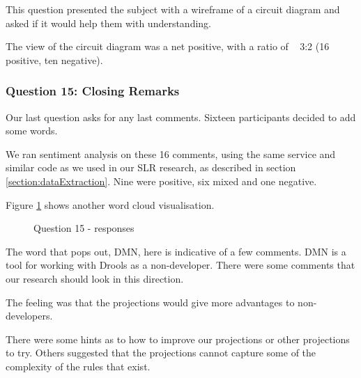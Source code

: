 This question presented the subject with a wireframe of a circuit diagram and asked if it would help them with understanding.

The view of the circuit diagram was a net positive, with a ratio of ~ 3:2 (16 positive, ten negative).

\subsubsection{Question 15: Closing Remarks}

Our last question asks for any last comments.
Sixteen participants decided to add some words.

We ran sentiment analysis on these 16 comments, using the same service and similar code as we used in our SLR research, as described in section \ref{section:dataExtraction}.
Nine were positive, six mixed and one negative.

Figure \ref{fig:Q15_wordcloud} shows another word cloud visualisation.

\begin{figure}[h]
    \centering
    \caption{Question 15 - responses}
    \label{fig:Q15_wordcloud}
\end{figure}

The word that pops out, DMN, here is indicative of a few comments.
DMN is a tool for working with Drools as a non-developer.
There were some comments that our research should look in this direction.

The feeling was that the projections would give more advantages to non-developers.

There were some hints as to how to improve our projections or other projections to try.
Others suggested that the projections cannot capture some of the complexity of the rules that exist.


